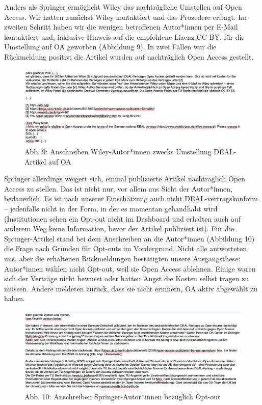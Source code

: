 \documentclass[a4paper,
fontsize=11pt,
oneside,
numbers=noperiodatend,
parskip=half-,
bibliography=totoc,
final
]{scrartcl}
\begin{document}
Anders als Springer ermöglicht Wiley das nachträgliche Umstellen auf
Open Access. Wir hatten zunächst Wiley kontaktiert und das Prozedere
erfragt. Im zweiten Schritt haben wir die wenigen betroffenen
Autor*innen per E-Mail kontaktiert und, inklusive Hinweis auf die
empfohlene Lizenz CC BY, für die Umstellung auf OA geworben (Abbildung
9). In zwei Fällen war die Rückmeldung positiv; die Artikel wurden auf
nachträglich Open Access gestellt.

\begin{figure}
\centering
\includegraphics[width=.9\textwidth]{img/optoutWileyauthor.png}
\caption{Abb. 9: Anschreiben Wiley-Autor*innen zwecks Umstellung
DEAL-Artikel auf OA}
\end{figure}

Springer allerdings weigert sich, einmal publizierte Artikel
nachträglich Open Access zu stellen. Das ist nicht nur, vor allem aus
Sicht der Autor*innen, bedauerlich. Es ist nach unserer Einschätzung
auch nicht DEAL-vertragskonform -- jedenfalls nicht in der Form, in der
es momentan gehandhabt wird (Institutionen sehen ein Opt-out nicht im
Dashboard und erhalten auch auf anderem Weg keine Information, bevor der
Artikel publiziert ist). Für die Springer-Artikel stand bei dem
Anschreiben an die Autor*innen (Abbildung 10) die Frage nach Gründen für
Opt-outs im Vordergrund. Nicht alle antworteten uns, aber die erhaltenen
Rückmeldungen bestätigten unsere Ausgangsthese: Autor*innen wählen nicht
Opt-out, weil sie Open Access ablehnen. Einige waren sich der Verträge
nicht bewusst oder hatten Angst die Kosten selbst tragen zu müssen.
Andere meldeten zurück, dass sie nicht erinnern, OA aktiv abgewählt zu
haben.

\begin{figure}
\centering
\includegraphics[width=.9\textwidth]{img/optoutSNauthor.png}
\caption{Abb. 10: Anschreiben Springer-Autor*innen bezüglich Opt-out}
\end{figure}
\end{document}
